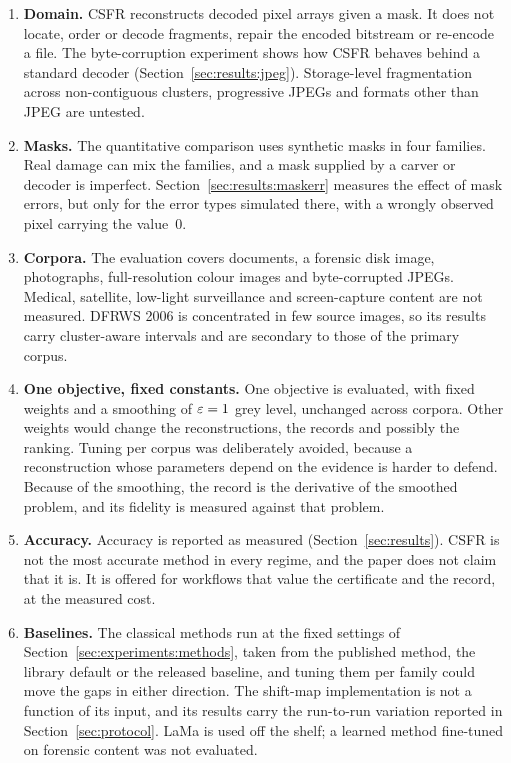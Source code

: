 \documentclass[final,3p]{elsarticle}
\begin{document}
\begin{enumerate}
  \item \textbf{Domain.} CSFR reconstructs decoded pixel arrays given a mask. It does not locate, order or decode fragments, repair the encoded bitstream or re-encode a file. The byte-corruption experiment shows how CSFR behaves behind a standard decoder (Section~\ref{sec:results:jpeg}). Storage-level fragmentation across non-contiguous clusters, progressive JPEGs and formats other than JPEG are untested.
  \item \textbf{Masks.} The quantitative comparison uses synthetic masks in four families. Real damage can mix the families, and a mask supplied by a carver or decoder is imperfect. Section~\ref{sec:results:maskerr} measures the effect of mask errors, but only for the error types simulated there, with a wrongly observed pixel carrying the value~0.
  \item \textbf{Corpora.} The evaluation covers documents, a forensic disk image, photographs, full-resolution colour images and byte-corrupted JPEGs. Medical, satellite, low-light surveillance and screen-capture content are not measured. DFRWS 2006 is concentrated in few source images, so its results carry cluster-aware intervals and are secondary to those of the primary corpus.
  \item \textbf{One objective, fixed constants.} One objective is evaluated, with fixed weights and a smoothing of $\varepsilon = 1$ grey level, unchanged across corpora. Other weights would change the reconstructions, the records and possibly the ranking. Tuning per corpus was deliberately avoided, because a reconstruction whose parameters depend on the evidence is harder to defend. Because of the smoothing, the record is the derivative of the smoothed problem, and its fidelity is measured against that problem.
  \item \textbf{Accuracy.} Accuracy is reported as measured (Section~\ref{sec:results}). CSFR is not the most accurate method in every regime, and the paper does not claim that it is. It is offered for workflows that value the certificate and the record, at the measured cost.
  \item \textbf{Baselines.} The classical methods run at the fixed settings of Section~\ref{sec:experiments:methods}, taken from the published method, the library default or the released baseline, and tuning them per family could move the gaps in either direction. The shift-map implementation is not a function of its input, and its results carry the run-to-run variation reported in Section~\ref{sec:protocol}. LaMa is used off the shelf; a learned method fine-tuned on forensic content was not evaluated.

\end{enumerate}
\end{document}
